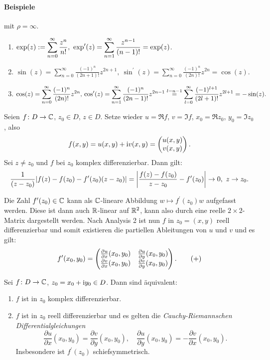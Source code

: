 \documentclass[a4paper,twoside,DIV15,BCOR12mm]{scrbook}
\begin{document}
\paragraph{Beispiele} mit $\rho = \infty$.\begin{enumerate}
\item $\displaystyle \exp(z) := \sum_{n=0}^\infty \frac{z^n}{n!},\ \exp^\prime(z) = \sum_{n=1}^\infty \frac{z^{n-1}}{(n-1)!} = \exp(z)$.
\item $\displaystyle \sin(z) = \sum_{n=0}^\infty \frac{(-1)^n}{(2n+1)!}z^{2n+1},\ \sin^\prime(z) = \sum_{n=0}^\infty \frac{(-1)^n}{(2n)!}z^{2n} = \cos(z).$
\item $\displaystyle \cos(z) = \sum_{n=0}^\infty \frac{(-1)^n}{(2n)!}z^{2n},\newline \cos^\prime(z) = \sum_{n=1}^\infty \frac{(-1)^n}{(2n-1)!}z^{2n-1} \stackrel{l=n-1}{=} \sum_{l=0}^\infty \frac{(-1)^{l+1}}{(2l+1)!}z^{2l+1} = -\sin(z).$
\end{enumerate}


\noindent Seien $f\colon D\rightarrow\mathbb{C}$, $z_0\in D$, $z\in D$. Setze wieder $u = \Re f$, $v = \Im f$, $x_0 = \Re z_0$, $y_0 = \Im z_0$, also
\[f(x,y) = u(x,y) + \mathrm{i} v(x,y) = \left(\!\!\!\begin{array}{c}u(x,y)\\v(x,y)\end{array}\!\!\!\right).\]
Sei $z\neq z_0$ und $f$ bei $z_0$ komplex differenzierbar. Dann gilt:
\[\frac{1}{(z-z_0)}|f(z)-f(z_0)-f^\prime(z_0)(z-z_0)| = \left\lvert\frac{f(z)-f(z_0)}{z-z_0} - f^\prime(z_0)\right\lvert \rightarrow 0,\ z\rightarrow z_0.\]

Die Zahl $f^\prime(z_0)\in\mathbb{C}$ kann als $\mathbb{C}$-lineare Abbildung $w\mapsto f^\prime(z_0)w$ aufgefasst werden. Diese ist dann auch $\mathbb{R}$-linear auf $\mathbb{R}^2$, kann also durch eine reelle $2\times 2$-Matrix dargestellt werden. Nach Analysis 2 ist nun $f$ in $z_0 = (x,y)$ reell differenzierbar und somit existieren die partiellen Ableitungen von $u$ und $v$ und es gilt:
\[\label{1.3+}f^\prime(x_0,y_0) = \left(\!\!\!\begin{array}{c c}\frac{\partial u}{\partial x} (x_0,y_0) & \frac{\partial u}{\partial y} (x_0,y_0)\\
\frac{\partial v}{\partial x} (x_0,y_0) & \frac{\partial v}{\partial y} (x_0,y_0)\end{array}\!\!\!\right).\tag{+}\]

\begin{satz} \label{satz1.4}
  Sei $f\colon D\rightarrow\mathbb{C}$, $z_0 = x_0 + \mathrm{i} y_0\in D$. Dann sind äquivalent:
\begin{enumerate}
\item $f$ ist in $z_0$ komplex differenzierbar.
\item $f$ ist in $z_0$ reell differenzierbar und es gelten die \emph{Cauchy-Riemannschen Differentialgleichungen}
\begin{equation} \label{CR}
\frac{\partial u}{\partial x} (x_0,y_0) = \frac{\partial v}{\partial y} (x_0,y_0),\quad \frac{\partial u}{\partial y} (x_0,y_0) =
-\frac{\partial v}{\partial x} (x_0,y_0). \tag{CR}
\end{equation}
Insbesondere ist $f^\prime(z_0)$ schiefsymmetrisch.
\end{enumerate}
\end{satz}
\end{document}
